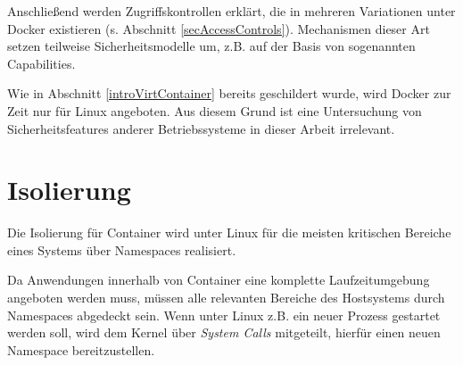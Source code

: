 \documentclass[../main.tex]{subfiles}
\begin{document}
	Anschließend werden Zugriffskontrollen erklärt, die in mehreren Variationen unter Docker existieren (s. Abschnitt \ref{secAccessControls}). Mechanismen dieser Art setzen teilweise Sicherheitsmodelle um, z.B. auf der Basis von sogenannten Capabilities.




	Wie in Abschnitt \ref{introVirtContainer} bereits geschildert wurde, wird Docker zur Zeit nur für Linux angeboten. Aus diesem Grund ist eine Untersuchung von Sicherheitsfeatures anderer Betriebssysteme in dieser Arbeit irrelevant.




	\section{Isolierung}
  \label{secIsolierung}
		Die Isolierung für Container wird unter Linux für die meisten kritischen Bereiche eines Systems über Namespaces realisiert.

		Da Anwendungen innerhalb von Container eine komplette Laufzeitumgebung angeboten werden muss, müssen alle relevanten Bereiche des Hostsystems durch Namespaces abgedeckt sein.	Wenn unter Linux z.B. ein neuer Prozess gestartet werden soll, wird dem Kernel über \emph{System Calls} mitgeteilt, hierfür einen neuen Namespace bereitzustellen.
\end{document}
